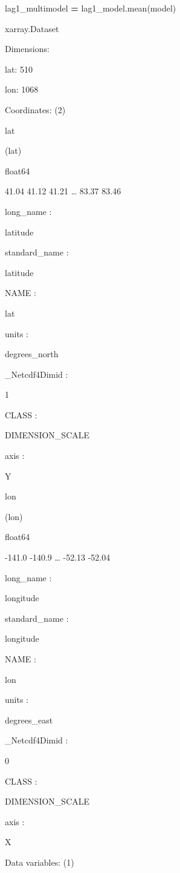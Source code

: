 \documentclass[
]{book}
\newenvironment{Shaded}{\begin{snugshade}}{\end{snugshade}}
\newcommand{\NormalTok}[1]{#1}
\newcommand{\OperatorTok}[1]{\textcolor[rgb]{0.81,0.36,0.00}{\textbf{#1}}}
\newcommand{\StringTok}[1]{\textcolor[rgb]{0.31,0.60,0.02}{#1}}
\begin{document}
\begin{Shaded}
\begin{Highlighting}[]
\NormalTok{lag1\_multimodel }\OperatorTok{=}\NormalTok{ lag1\_model.mean(}\StringTok{\textquotesingle{}model\textquotesingle{}}\NormalTok{)}
\end{Highlighting}
\end{Shaded}

xarray.Dataset

Dimensions:

{lat}: 510

{lon}: 1068

Coordinates: {(2)}

{lat}

(lat)

float64

41.04 41.12 41.21 \ldots{} 83.37 83.46

{long\_name :}

latitude

{standard\_name :}

latitude

{NAME :}

lat

{units :}

degrees\_north

\_Netcdf4Dimid :

1

{CLASS :}

DIMENSION\_SCALE

{axis :}

Y

{lon}

(lon)

float64

-141.0 -140.9 \ldots{} -52.13 -52.04

{long\_name :}

longitude

{standard\_name :}

longitude

{NAME :}

lon

{units :}

degrees\_east

\_Netcdf4Dimid :

0

{CLASS :}

DIMENSION\_SCALE

{axis :}

X

Data variables: {(1)}
\end{document}

